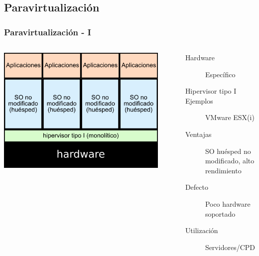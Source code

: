 \documentclass{beamer}
\begin{document}
\subsection{Paravirtualización}
\begin{frame} \frametitle{Paravirtualización - I}
  \begin{columns}
    \begin{center}
    \includegraphics[width=0.9\textwidth]{paravirt_monolitica.png}      
    \end{center}
    \begin{description}
    \item[Hardware] Específico 
    \item[Hipervisor tipo I]
    \item[Ejemplos] VMware ESX(i)
    \item [Ventajas] SO huésped no modificado, alto rendimiento
    \item[Defecto] Poco hardware soportado
    \item[Utilización] Servidores/CPD
    \end{description}
  \end{columns}
\end{frame}
\end{document}
